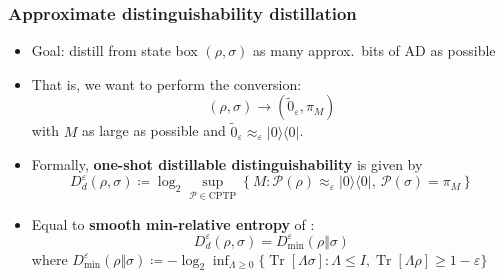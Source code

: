\documentclass[usenames,dvipsnames,handout]{beamer}
\begin{document}
\begin{frame}
\frametitle{Approximate distinguishability distillation}

\begin{itemize}

\pause
\item Goal: distill from state box $(\rho,\sigma)$ as many approx.~bits of AD as possible

\pause
\item That is, we want to perform the conversion:
$$
(\rho,\sigma) \rightarrow (\widetilde{0}_{\varepsilon}, \pi_M)
$$
with $M$ as large as possible and $\widetilde{0}_{\varepsilon} \approx_{\varepsilon} |0\rangle \langle 0|$.

\pause
\item Formally, {\color{MidnightBlue}\textbf{one-shot distillable distinguishability}}  is given by
$$
D_{d}^{\varepsilon}(\rho,\sigma)\coloneqq 
\log_{2}\sup_{\mathcal{P}\in\text{CPTP}}\left\{  M:\mathcal{P}(\rho
)\approx_{\varepsilon} |0\rangle\!\langle0|,\ \mathcal{P}(\sigma)=\pi_{M}\right\}  
$$

\pause
\item Equal to {\color{MidnightBlue}\textbf{smooth min-relative entropy}} of \cite{BD10,BD11,WR12}:
$$
D_{d}^{\varepsilon}(\rho,\sigma) = D_{\min}^{\varepsilon}(\rho \Vert \sigma)
$$
where $D_{\min}^{\varepsilon}(\rho \Vert \sigma) \coloneqq  -\log_{2}\inf_{\Lambda \geq 0}\{ \operatorname{Tr}[\Lambda%
\sigma] : \Lambda\leq I , \operatorname{Tr}[\Lambda \rho]\geq 1- \varepsilon\}$

\end{itemize}

\end{frame}
\end{document}
